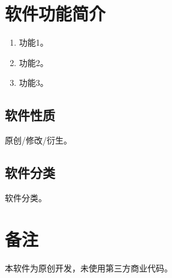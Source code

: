 \documentclass[a4paper,12pt]{article}
\begin{document}
\section{软件功能简介}

\begin{enumerate}[leftmargin=2em]
  \item {{功能1}}。
  \item {{功能2}}。
  \item {{功能3}}。
\end{enumerate}

\subsection{软件性质}

{{原创/修改/衍生}}。

\subsection{软件分类}

{{软件分类}}。


\section{备注}

本软件为原创开发，未使用第三方商业代码。
\end{document}
